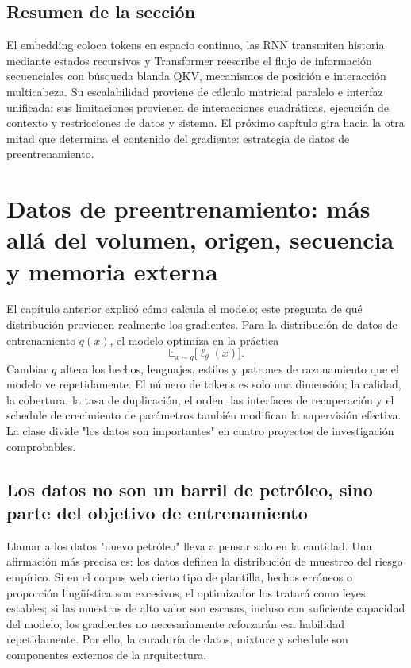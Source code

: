 \documentclass[a4paper]{article}
\begin{document}
\subsection{Resumen de la sección}

El embedding coloca tokens en espacio continuo, las RNN transmiten historia mediante estados recursivos y Transformer reescribe el flujo de información secuenciales con búsqueda blanda QKV, mecanismos de posición e interacción multicabeza. Su escalabilidad proviene de cálculo matricial paralelo e interfaz unificada; sus limitaciones provienen de interacciones cuadráticas, ejecución de contexto y restricciones de datos y sistema. El próximo capítulo gira hacia la otra mitad que determina el contenido del gradiente: estrategia de datos de preentrenamiento.

\section{Datos de preentrenamiento: más allá del volumen, origen, secuencia y memoria externa}

El capítulo anterior explicó cómo calcula el modelo; este pregunta de qué distribución provienen realmente los gradientes. Para la distribución de datos de entrenamiento $q(x)$, el modelo optimiza en la práctica
\[
\mathbb{E}_{x\sim q}\big[\ell_{\theta}(x)\big].
\]
Cambiar $q$ altera los hechos, lenguajes, estilos y patrones de razonamiento que el modelo ve repetidamente. El número de tokens es solo una dimensión; la calidad, la cobertura, la tasa de duplicación, el orden, las interfaces de recuperación y el schedule de crecimiento de parámetros también modifican la supervisión efectiva. La clase divide "los datos son importantes" en cuatro proyectos de investigación comprobables.

\subsection{Los datos no son un barril de petróleo, sino parte del objetivo de entrenamiento}

Llamar a los datos "nuevo petróleo" lleva a pensar solo en la cantidad. Una afirmación más precisa es: los datos definen la distribución de muestreo del riesgo empírico. Si en el corpus web cierto tipo de plantilla, hechos erróneos o proporción lingüística son excesivos, el optimizador los tratará como leyes estables; si las muestras de alto valor son escasas, incluso con suficiente capacidad del modelo, los gradientes no necesariamente reforzarán esa habilidad repetidamente. Por ello, la curaduría de datos, mixture y schedule son componentes externos de la arquitectura.
\end{document}
